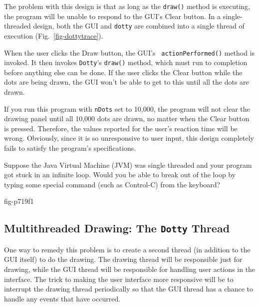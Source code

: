 The problem with this design is that as long as the {\tt draw()}
method is executing, the program will be unable to respond to
the GUI's Clear button.  In a single-threaded design, both the
GUI and {\tt dotty} are combined into a single thread of execution
(Fig.~\ref{fig-dottytrace}).
\begin{figure}[h!]
\end{figure}
When the user clicks the Draw button, the GUI's {\tt
actionPerformed()} method is invoked.  It then invokes {\tt Dotty}'s
{\tt draw()} method, which must run to completion before anything else
can be done.  If the user clicks the Clear button while the dots are
being drawn, the GUI won't be able to get to this until all the dots
are drawn.

If you run this program with {\tt nDots} set to 10,000, the program
will not clear the drawing panel until all 10,000 dots are drawn, no
matter when the Clear button is pressed.  Therefore, the values
reported for the user's reaction time will be wrong.   Obviously, since
it is so unresponsive to user input, this design completely fails to
satisfy the program's specifications.


\begin{SSTUDY}

\item  Suppose the Java Virtual Machine (JVM) was single threaded and your
program got stuck in an infinite loop.  Would you be able to break out
of the loop by typing some special command (such as Control-C) from
the keyboard?
\end{SSTUDY}

{fig-p719f1}

\subsection{Multithreaded Drawing: The {\tt Dotty} Thread}
\noindent One way to remedy this problem is to create a second thread (in
addition to the GUI itself) to do the drawing.  The drawing thread
will be responsible just for drawing, while the GUI thread will be
responsible for handling user actions in the interface.   The trick to
making the user interface more responsive will be to interrupt the
drawing thread periodically so that the GUI thread has a chance to
handle any events that have occurred.

